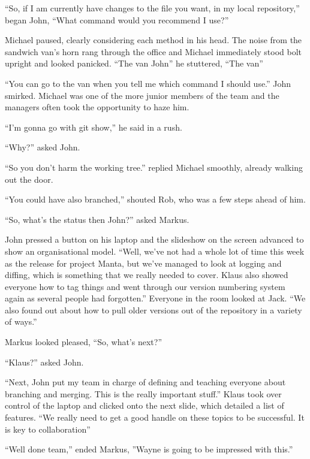\begin{trenches}
``So, if I am currently have changes to the file you want, in my local repository,'' began John,
``What command would you recommend I use?''

Michael paused, clearly considering each method in his head.
The noise from the sandwich van's horn rang through the office and Michael immediately stood bolt upright and looked panicked.
``The van John'' he stuttered, ``The van''

``You can go to the van when you tell me which command I should use.'' John smirked.
Michael was one of the more junior members of the team and the managers often took the opportunity to haze him.

``I'm gonna go with git show,'' he said in a rush.

``Why?'' asked John.

``So you don't harm the working tree.'' replied Michael smoothly, already walking out the door.

``You could have also branched,'' shouted Rob, who was a few steps ahead of him.

\thoughtbreak

``So, what's the status then John?'' asked Markus.

John pressed a button on his laptop and the slideshow on the screen advanced to show an organisational model.
``Well, we've not had a whole lot of time this week as the release for project Manta, but we've managed to look at logging and diffing, which is something that we really needed to cover. Klaus also showed everyone how to tag things and went through our version numbering system again as several people had forgotten.''
Everyone in the room looked at Jack.
``We also found out about how to pull older versions out of the repository in a variety of ways.''

Markus looked pleased, ``So, what's next?''

``Klaus?'' asked John.

``Next, John put my team in charge of defining and teaching everyone about branching and merging. This is the really important stuff.''
Klaus took over control of the laptop and clicked onto the next slide, which detailed a list of features.
``We really need to get a good handle on these topics to be successful. It is key to collaboration''

``Well done team,'' ended Markus,
''Wayne is going to be impressed with this.''

\end{trenches}

